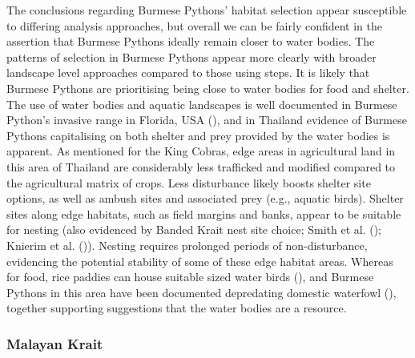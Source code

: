 \documentclass[10pt,a4paper]{article}
\begin{document}
The conclusions regarding Burmese Pythons' habitat selection appear susceptible to differing analysis approaches, but overall we can be fairly confident in the assertion that Burmese Pythons ideally remain closer to water bodies.
The patterns of selection in Burmese Pythons appear more clearly with broader landscape level approaches compared to those using steps.
It is likely that Burmese Pythons are prioritising being close to water bodies for food and shelter.
The use of water bodies and aquatic landscapes is well documented in Burmese Python's invasive range in Florida, USA (), and in Thailand evidence of Burmese Pythons capitalising on both shelter and prey provided by the water bodies is apparent.
As mentioned for the King Cobras, edge areas in agricultural land in this area of Thailand are considerably less trafficked and modified compared to the agricultural matrix of crops.
Less disturbance likely boosts shelter site options, as well as ambush sites and associated prey (e.g., aquatic birds).
Shelter sites along edge habitats, such as field margins and banks, appear to be suitable for nesting (also evidenced by Banded Krait nest site choice; Smith et al. (); Knierim et al. ()).
Nesting requires prolonged periods of non-disturbance, evidencing the potential stability of some of these edge habitat areas.
Whereas for food, rice paddies can house suitable sized water birds (), and Burmese Pythons in this area have been documented depredating domestic waterfowl (), together supporting suggestions that the water bodies are a resource.

\subsubsection{Malayan Krait}\label{malayan-krait-1}
\end{document}
